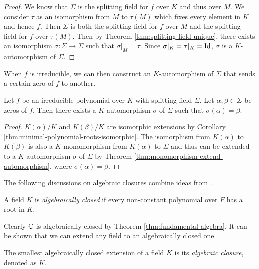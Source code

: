 \begin{proof}
	We know that $\Sigma$ is the splitting field for $f$ over $K$ and thus over $M$. We consider $\tau$ as an isomorphism from $M$ to $\tau(M)$ which fixes every element in $K$ and hence $f$. Then $\Sigma$ is both the splitting field for $f$ over $M$ and the splitting field for $f$ over $\tau(M)$. Then by Theorem \ref{thm:splitting-field-unique}, there exists an isomorphism $\sigma: \Sigma \to \Sigma$ such that $\sigma | _M = \tau$. Since $\sigma | _K = \tau |_K = \operatorname{Id}$, $\sigma$ is a $K$-automorphism of $\Sigma$. 
\end{proof}

When $f$ is irreducible, we can then construct an $K$-automorphism of $\Sigma$ that sends a certain zero of $f$ to another.

\begin{theorem} \label{thm:automorphism-from-zeros}
	Let $f$ be an irreducible polynomial over $K$ with splitting field $\Sigma$. Let $\alpha, \beta \in \Sigma$ be zeros of $f$. Then there exists a $K$-automorphism $\sigma$ of $\Sigma$ such that $\sigma(\alpha) = \beta$. 
\end{theorem}

\begin{proof}
	$K(\alpha)/K$ and $K(\beta)/K$ are isomorphic extensions by Corollary \ref{thm:minimal-polynomial-roots-isomorphic}. The isomorphism from $K(\alpha)$ to $K(\beta)$ is also a $K$-monomorphism from $K(\alpha)$ to $\Sigma$ and thus can be extended to a $K$-automorphism $\sigma$ of $\Sigma$ by Theorem \ref{thm:monomorphism-extend-automorphism}, where $\sigma(\alpha) = \beta$.
\end{proof}

The following discussions on algebraic closures combine ideas from \cite{galois-theory-lectures, rotman_galois_1998}. 

\begin{definition}
	A field $K$ is \textit{algebraically closed} if every non-constant polynomial over $F$ has a root in $K$. 
\end{definition}

Clearly $\mathbb C$ is algebraically closed by Theorem \ref{thm:fundamental-algebra}. It can be shown that we can extend any field to an algebraically closed one. 

\begin{definition}
	The smallest algebraically closed extension of a field $K$ is its \textit{algebraic closure}, denoted as $\overline K$.
\end{definition}

